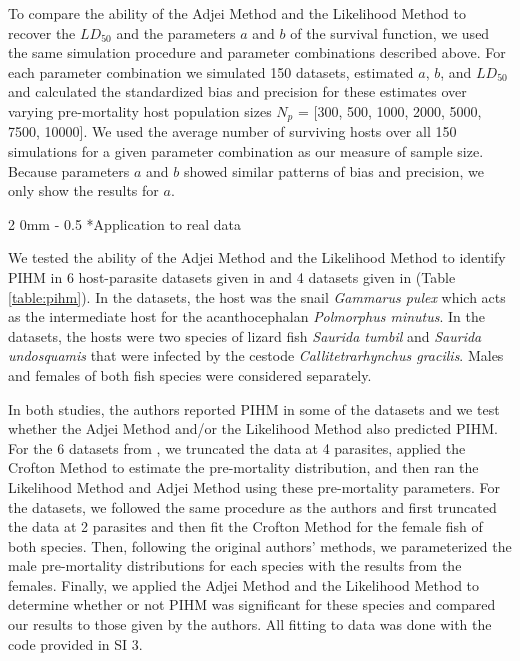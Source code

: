 \documentclass[12pt, a4paper]{article}
\makeatletter
\renewcommand{\subsection}{\@startsection
{subsection}%
{2}%
{0mm}%
{-\baselineskip}%
{0.5\baselineskip}%
{\normalfont\bf}} %
\makeatother
\begin{document}
To compare the ability of the Adjei Method and the Likelihood Method to recover the $LD_{50}$ and the parameters $a$ and $b$ of the survival function, we used the same simulation procedure and parameter combinations described above. For each parameter
combination we simulated 150 datasets, estimated $a$, $b$, and $LD_{50}$ and calculated the standardized bias and
precision \citep{Walther2005} for these estimates over varying pre-mortality host population sizes  $N_p$ = [300, 500, 1000, 2000, 5000, 7500,
10000]. We used the average number of surviving hosts over all 150 simulations for a given parameter combination as our measure of sample size.  Because parameters $a$ and $b$ showed similar patterns of bias and precision, we only show the results for $a$.

\subsection*{Application to real data}

We tested the ability of the Adjei Method and the Likelihood Method to identify
PIHM in 6 host-parasite datasets given in \cite{Crofton1971a} and 4 datasets
given in \cite{Adjei1986} (Table \ref{table:pihm}). In the \cite{Crofton1971a} datasets, the host was
the snail \emph{Gammarus pulex} which acts as the intermediate host for the
acanthocephalan \emph{Polmorphus minutus}. In the \cite{Adjei1986} datasets,
the hosts were two species of lizard fish \emph{Saurida tumbil} and
\emph{Saurida undosquamis} that were infected by the cestode
\emph{Callitetrarhynchus gracilis}.  Males and females of both fish species
were considered separately.

In both studies, the authors reported PIHM in some of the datasets and we test whether the Adjei
Method and/or the Likelihood Method also predicted PIHM. For the 6 datasets from
\cite{Crofton1971a}, we truncated the data at 4 parasites, applied the Crofton
Method to estimate the pre-mortality distribution, and then ran the Likelihood
Method and Adjei Method using these pre-mortality parameters.  For the
\cite{Adjei1986} datasets, we followed the same procedure as the authors and
first truncated the data at 2 parasites and then fit the Crofton Method for the
female fish of both species.  Then, following the original authors' methods, we parameterized the male pre-mortality
distributions for each species with the results from the females.  Finally, we
applied the Adjei Method and the Likelihood Method to determine whether or not
PIHM was significant for these species and compared our results to those given by the authors.  All fitting to data was done with the code provided in SI 3.
\end{document}
